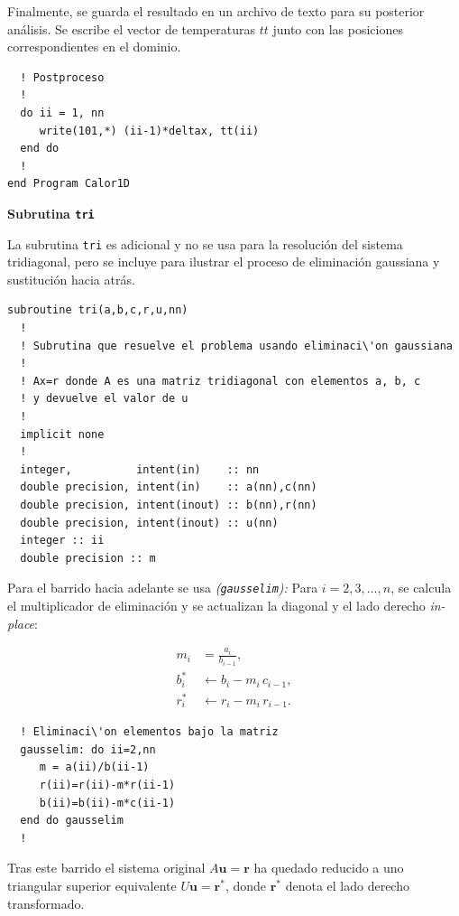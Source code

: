 \documentclass[11pt,a4paper]{article}
\begin{document}
Finalmente, se guarda el resultado en un archivo de texto para su posterior
an\'alisis. Se escribe el vector de temperaturas $tt$ junto con las posiciones
correspondientes en el dominio.

\begin{verbatim}
  ! Postproceso
  !
  do ii = 1, nn
     write(101,*) (ii-1)*deltax, tt(ii)
  end do
  !
end Program Calor1D
\end{verbatim}

\textbf{Subrutina \texttt{tri}}  

\medskip

La subrutina \verb|tri| es adicional y no se usa para la resoluci\'on del 
sistema tridiagonal, pero se incluye para ilustrar el proceso de 
eliminaci\'on gaussiana y sustituci\'on hacia atr\'as.

\begin{verbatim}
subroutine tri(a,b,c,r,u,nn)
  !
  ! Subrutina que resuelve el problema usando eliminaci\'on gaussiana
  !
  ! Ax=r donde A es una matriz tridiagonal con elementos a, b, c
  ! y devuelve el valor de u
  !
  implicit none
  !
  integer,          intent(in)    :: nn
  double precision, intent(in)    :: a(nn),c(nn)
  double precision, intent(inout) :: b(nn),r(nn)
  double precision, intent(inout) :: u(nn)
  integer :: ii
  double precision :: m
\end{verbatim}

Para el barrido hacia adelante se usa \textit{(\texttt{gausselim}):}
Para $i = 2, 3, \ldots, n$, se calcula el multiplicador de eliminaci\'on y
se actualizan la diagonal y el lado derecho \textit{in-place}:

\begin{align}
m_{i}          &= \frac{a_{i}}{b_{i-1}}, \\
b_{i}^{*}          &\leftarrow b_{i} - m_{i}\, c_{i-1}, \\
r_{i}^{*}          &\leftarrow r_{i} - m_{i}\, r_{i-1}.
\end{align}

\begin{verbatim}
  ! Eliminaci\'on elementos bajo la matriz
  gausselim: do ii=2,nn
     m = a(ii)/b(ii-1)
     r(ii)=r(ii)-m*r(ii-1)
     b(ii)=b(ii)-m*c(ii-1)
  end do gausselim
  !
\end{verbatim}

Tras este barrido el sistema original $A\mathbf{u}=\mathbf{r}$ ha quedado
reducido a uno triangular superior equivalente $U\mathbf{u}=\mathbf{r}^*$,
donde $\mathbf{r}^*$ denota el lado derecho transformado.
\end{document}
